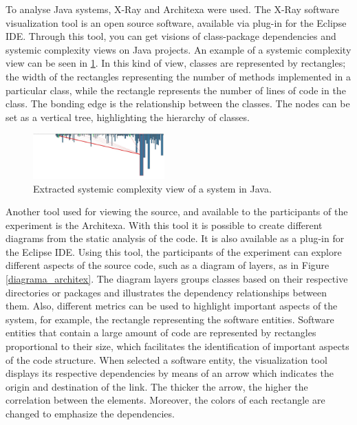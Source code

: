 \documentclass{sig-alternate-05-2015}
\begin{document}
To analyse Java systems,  X-Ray and Architexa were used. The X-Ray software visualization tool is an open source software, available via plug-in for the Eclipse IDE. Through this tool, you can get visions of class-package dependencies and systemic complexity views on Java projects. An example of a systemic complexity view can be seen in \ref{xray_complexidade}. In this kind of view, classes are represented by rectangles; the width of the rectangles representing the number of methods implemented in a particular class, while the rectangle represents the number of lines of code in the class. The bonding edge is the relationship between the classes. The nodes can be set as a vertical tree, highlighting the hierarchy of classes.

\begin{figure}[!h]
	\centering
	\includegraphics[width=0.45\textwidth]{6_xray_complexidade}
	\caption{Extracted systemic complexity view of a system in Java.}
	\label{xray_complexidade}
\end{figure}

Another tool used for viewing the source, and available to the participants of the experiment is the Architexa. With this tool it is possible to create different diagrams from the static analysis of the code. It is also available as a plug-in for the Eclipse IDE. Using this tool, the participants of the experiment can explore different aspects of the source code, such as a diagram of layers, as in Figure \ref{diagrama_architex}. The diagram layers groups classes based on their respective directories or packages and illustrates the dependency relationships between them. Also, different metrics can be used to highlight important aspects of the system, for example, the rectangle representing the software entities. Software entities that contain a large amount of code are represented by rectangles proportional to their size, which facilitates the identification of important aspects of the code structure. When selected a software entity, the visualization tool displays its respective dependencies by means of an arrow which indicates the origin and destination of the link. The thicker the arrow, the higher the correlation between the elements. Moreover, the colors of each rectangle are changed to emphasize the dependencies.
\end{document}
